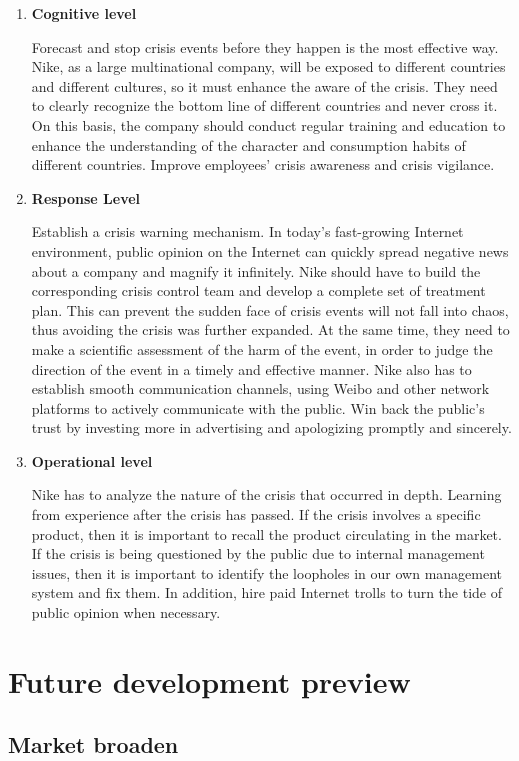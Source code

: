 \documentclass[a4paper, 12pt]{report}
\begin{document}
\begin{enumerate}
    \item \textbf{Cognitive level}\par Forecast and stop crisis events before they happen is the most effective way. Nike, as a large multinational company, will be exposed to different countries and different cultures, so it must enhance the aware of the crisis. They need to clearly recognize the bottom line of different countries and never cross it. On this basis, the company should conduct regular training and education to enhance the understanding of the character and consumption habits of different countries. Improve employees' crisis awareness and crisis vigilance.
    \item \textbf{Response Level}\par Establish a crisis warning mechanism. In today's fast-growing Internet environment, public opinion on the Internet can quickly spread negative news about a company and magnify it infinitely. Nike should have to build the corresponding crisis control team and develop a complete set of treatment plan. This can prevent the sudden face of crisis events will not fall into chaos, thus avoiding the crisis was further expanded. At the same time, they need to make a scientific assessment of the harm of the event, in order to judge the direction of the event in a timely and effective manner. Nike also has to establish smooth communication channels, using Weibo and other network platforms to actively communicate with the public. Win back the public's trust by investing more in advertising and apologizing promptly and sincerely.
    \item \textbf{Operational level}\par Nike has to analyze the nature of the crisis that occurred in depth. Learning from experience after the crisis has passed. If the crisis involves a specific product, then it is important to recall the product circulating in the market. If the crisis is being questioned by the public due to internal management issues, then it is important to identify the loopholes in our own management system and fix them. In addition, hire paid Internet trolls to turn the tide of public opinion when necessary.

\end{enumerate}
\section{Future development preview}
\subsection{Market broaden}
\end{document}
